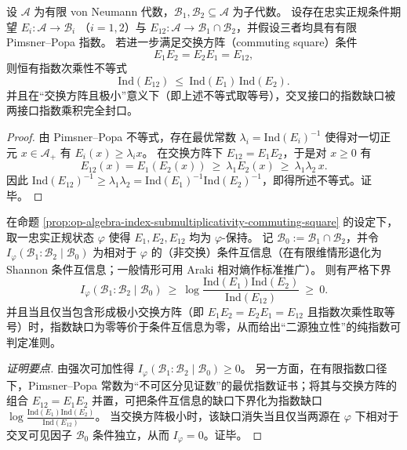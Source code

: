\begin{proposition}\label{prop:op-algebra-index-submultiplicativity-commuting-square}
设 \(\mathcal{A}\) 为有限 von Neumann 代数，\(\mathcal{B}_1,\mathcal{B}_2\subseteq\mathcal{A}\) 为子代数。
设存在忠实正规条件期望
\(
E_i:\mathcal{A}\to\mathcal{B}_i
\)
（\(i=1,2\)）与
\(
E_{12}:\mathcal{A}\to\mathcal{B}_1\cap\mathcal{B}_2
\)，并假设三者均具有有限 Pimsner--Popa 指数。
若进一步满足交换方阵（commuting square）条件
\[
\boxed{\;E_1E_2=E_2E_1=E_{12},\;}
\]
则恒有指数次乘性不等式
\[
\boxed{\;\mathrm{Ind}(E_{12})\ \le\ \mathrm{Ind}(E_1)\,\mathrm{Ind}(E_2).\;}
\]
并且在“交换方阵且极小”意义下（即上述不等式取等号），交叉接口的指数缺口被两接口指数乘积完全封口。
\end{proposition}
\begin{proof}
由 Pimsner--Popa 不等式，存在最优常数 \(\lambda_i=\mathrm{Ind}(E_i)^{-1}\) 使得对一切正元 \(x\in\mathcal{A}_+\) 有 \(E_i(x)\ge \lambda_i x\)。
在交换方阵下 \(E_{12}=E_1E_2\)，于是对 \(x\ge 0\) 有
\[
E_{12}(x)=E_1(E_2(x))\ \ge\ \lambda_1E_2(x)\ \ge\ \lambda_1\lambda_2\,x.
\]
因此 \(\mathrm{Ind}(E_{12})^{-1}\ge \lambda_1\lambda_2=\mathrm{Ind}(E_1)^{-1}\mathrm{Ind}(E_2)^{-1}\)，即得所述不等式。证毕。
\end{proof}

\begin{corollary}\label{cor:op-algebra-cmi-lower-bound-by-index-gap}
在命题 \ref{prop:op-algebra-index-submultiplicativity-commuting-square} 的设定下，取一忠实正规状态 \(\varphi\) 使得 \(E_1,E_2,E_{12}\) 均为 \(\varphi\)-保持。
记 \(\mathcal{B}_0:=\mathcal{B}_1\cap\mathcal{B}_2\)，并令
\(
I_\varphi(\mathcal{B}_1:\mathcal{B}_2\mid\mathcal{B}_0)
\)
为相对于 \(\varphi\) 的（非交换）条件互信息（在有限维情形退化为 Shannon 条件互信息；一般情形可用 Araki 相对熵作标准推广）。
则有严格下界
\[
\boxed{\;
I_\varphi(\mathcal{B}_1:\mathcal{B}_2\mid\mathcal{B}_0)
\ \ge\
\log\frac{\mathrm{Ind}(E_1)\mathrm{Ind}(E_2)}{\mathrm{Ind}(E_{12})}
\ \ge\ 0.\;}
\]
并且当且仅当包含形成极小交换方阵（即 \(E_1E_2=E_2E_1=E_{12}\) 且指数次乘性取等号）时，指数缺口为零等价于条件互信息为零，从而给出“二源独立性”的纯指数可判定准则。
\end{corollary}
\begin{proof}[证明要点]
由强次可加性得 \(I_\varphi(\mathcal{B}_1:\mathcal{B}_2\mid\mathcal{B}_0)\ge 0\)。
另一方面，在有限指数口径下，Pimsner--Popa 常数为“不可区分见证数”的最优指数证书；将其与交换方阵的组合 \(E_{12}=E_1E_2\) 并置，可把条件互信息的缺口下界化为指数缺口 \(\log\frac{\mathrm{Ind}(E_1)\mathrm{Ind}(E_2)}{\mathrm{Ind}(E_{12})}\)。
当交换方阵极小时，该缺口消失当且仅当两源在 \(\varphi\) 下相对于交叉可见因子 \(\mathcal{B}_0\) 条件独立，从而 \(I_\varphi=0\)。证毕。
\end{proof}


